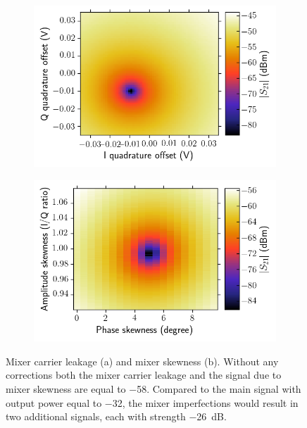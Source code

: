       \begin{figure}[tb]
        \centering
        \begin{subfigure}[h]{0.49\textwidth}
          \caption{}
          \includegraphics[width=\textwidth]{../Figures/Calibration routines/Mixer offset.png}
        \end{subfigure}
        \begin{subfigure}[h]{0.49\textwidth}
          \caption{}
          \includegraphics[width=\textwidth]{../Figures/Calibration routines/Mixer skewness.png}
        \end{subfigure}
        \caption{Mixer carrier leakage (a) and mixer skewness (b). Without any corrections both the mixer carrier leakage and the signal due to mixer skewness are equal to \SI{-58}{\dBm}. Compared to the main signal with output power equal to \SI{-32}{\dBm}, the mixer imperfections would result in two additional signals, each with strength \SI{-26}{\dB}.}
        \label{fig:Mixer calibrations 2D}
      \end{figure}


